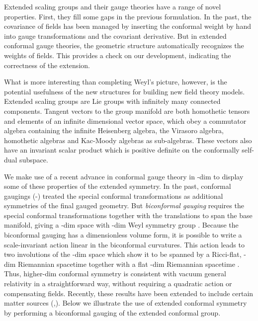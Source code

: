 \documentclass[a4paper,12pt]{article}
\begin{document}
Extended scaling groups and their gauge theories have a range of novel
properties. First, they fill some gaps in the previous formulation. In
the past, the covariance of fields has been managed by inserting the
conformal weight by hand into gauge transformations and the covariant
derivative. But in extended conformal gauge theories, the geometric
structure automatically recognizes the weights of fields. This provides a
check on our development, indicating the correctness of the extension.

What is more interesting than completing Weyl's picture, however, is the
potential usefulness of the new structures for building new field theory
models. Extended scaling groups are Lie groups with infinitely many
connected components. Tangent vectors to the group manifold are both
homothetic tensors and elements of an infinite dimensional vector space,
which obey a commutator algebra containing the infinite Heisenberg algebra,
the Virasoro algebra, homothetic algebras and Kac-Moody algebras as
sub-algebras. These vectors also have an invariant scalar product which is
positive definite on the conformally self-dual subspace.

We make use of a recent advance in conformal gauge theory in \coordHE{}-dim to
display some of these properties of the extended symmetry. In the past,
conformal gaugings (\cite{Romao+Ferber+Freund}-\cite{Townsend+van
Nieuwenhuizen}) treated the special conformal transformations as additional
symmetries of the final gauged geometry. But \textit{biconformal gauging}
requires the special conformal transformations together with the
translations to span the base manifold, giving a \coordHE{}-dim space with \coordHE{}-dim
Weyl symmetry group \cite{New Conformal Gauging Paper}. Because the
biconformal gauging has a dimensionless volume form, it is possible to write
a scale-invariant action linear in the biconformal curvatures. This action
leads to two involutions of the \coordHE{}-dim space which show it to be spanned
by a Ricci-flat, \coordHE{}-dim Riemannian spacetime together with a flat \coordHE{}-dim
Riemannian spacetime \cite{WWI}. Thus, higher-dim conformal symmetry is
consistent with vacuum general relativity in a straightforward way, without
requiring a quadratic action or compensating fields. Recently, these results
have been extended to include certain matter sources (\cite{WWII},\cite
{WWIII}). Below we illustrate the use of extended conformal symmetry by
performing a biconformal gauging of the extended conformal group.
\end{document}
